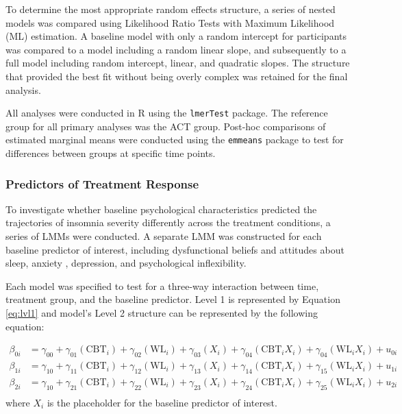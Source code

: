 \documentclass[
  english,
  man]{apa6}
\begin{document}
To determine the most appropriate random effects structure, a series of nested models was compared using Likelihood Ratio Tests with Maximum Likelihood (ML) estimation. A baseline model with only a random intercept for participants was compared to a model including a random linear slope, and subsequently to a full model including random intercept, linear, and quadratic slopes. The structure that provided the best fit without being overly complex was retained for the final analysis.

All analyses were conducted in R using the \texttt{lmerTest} package. The reference group for all primary analyses was the ACT group. Post-hoc comparisons of estimated marginal means were conducted using the \texttt{emmeans} package to test for differences between groups at specific time points.

\subsubsection{Predictors of Treatment Response}\label{predictors-of-treatment-response}

To investigate whether baseline psychological characteristics predicted the trajectories of insomnia severity differently across the treatment conditions, a series of LMMs were conducted. A separate LMM was constructed for each baseline predictor of interest, including dysfunctional beliefs and attitudes about sleep, anxiety , depression, and psychological inflexibility.

Each model was specified to test for a three-way interaction between time, treatment group, and the baseline predictor. Level 1 is represented by Equation \eqref{eq:lvl1} and model's Level 2 structure can be represented by the following equation:

\[
\begin{aligned}
  \beta_{0i} &= \gamma_{00} + \gamma_{01}(\text{CBT}_i) + \gamma_{02}(\text{WL}_i) + \gamma_{03}(X_i) +
  \gamma_{04}(\text{CBT}_iX_i) + \gamma_{04}(\text{WL}_iX_i) + u_{0i}\\
  \beta_{1i} &= \gamma_{10} + \gamma_{11}(\text{CBT}_i) + \gamma_{12}(\text{WL}_i) + \gamma_{13}(X_i) +
  \gamma_{14}(\text{CBT}_iX_i) + \gamma_{15}(\text{WL}_iX_i) + u_{1i}\\
  \beta_{2i} &= \gamma_{10} + \gamma_{21}(\text{CBT}_i) + \gamma_{22}(\text{WL}_i) + \gamma_{23}(X_i) +
  \gamma_{24}(\text{CBT}_iX_i) + \gamma_{25}(\text{WL}_iX_i) + u_{2i}\\
\end{aligned}
\]
where \(X_i\) is the placeholder for the baseline predictor of interest.
\end{document}
